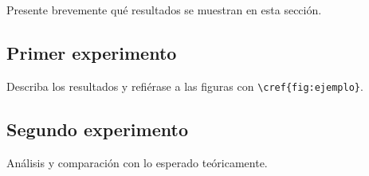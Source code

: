 Presente brevemente qué resultados se muestran en esta sección.

\subsection{Primer experimento}

Describa los resultados y refiérase a las figuras con \verb|\cref{fig:ejemplo}|.




\subsection{Segundo experimento}

Análisis y comparación con lo esperado teóricamente.
